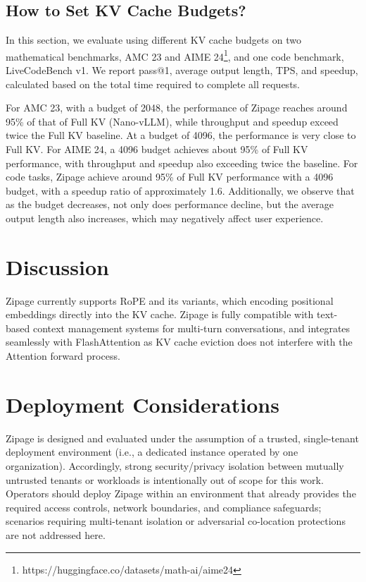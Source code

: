 \documentclass[11pt]{article}
\begin{document}
\subsection{How to Set KV Cache Budgets?}

In this section, we evaluate using different KV cache budgets on two mathematical benchmarks, AMC 23 and AIME 24\footnote{https://huggingface.co/datasets/math-ai/aime24}, and one code benchmark, LiveCodeBench \citep{jain2024livecodebench} v1. We report pass@1, average output length, TPS, and speedup, calculated based on the total time required to complete all requests.

For AMC 23, with a budget of 2048, the performance of Zipage reaches around 95\% of that of Full KV (Nano-vLLM), while throughput and speedup exceed twice the Full KV baseline. At a budget of 4096, the performance is very close to Full KV. For AIME 24, a 4096 budget achieves about 95\% of Full KV performance, with throughput and speedup also exceeding twice the baseline. For code tasks, Zipage achieve around  95\% of Full KV performance with a 4096 budget, with a speedup ratio of approximately 1.6.  Additionally, we observe that as the budget decreases, not only does performance decline, but the average output length also increases, which may negatively affect user experience. 

\section{Discussion}
Zipage currently supports RoPE \citep{su2024roformer} and its variants, which encoding positional embeddings directly into the KV cache. Zipage is fully compatible with text-based context management systems for multi-turn conversations, and integrates seamlessly with FlashAttention \citep{dao2022flashattention} as KV cache eviction does not interfere with the Attention forward process.

\section{Deployment Considerations}

Zipage is designed and evaluated under the assumption of a trusted, single-tenant deployment environment (i.e., a dedicated instance operated by one organization). Accordingly, strong security/privacy isolation between mutually untrusted tenants or workloads is intentionally out of scope for this work. Operators should deploy Zipage within an environment that already provides the required access controls, network boundaries, and compliance safeguards; scenarios requiring multi-tenant isolation or adversarial co-location protections are not addressed here.
\end{document}
